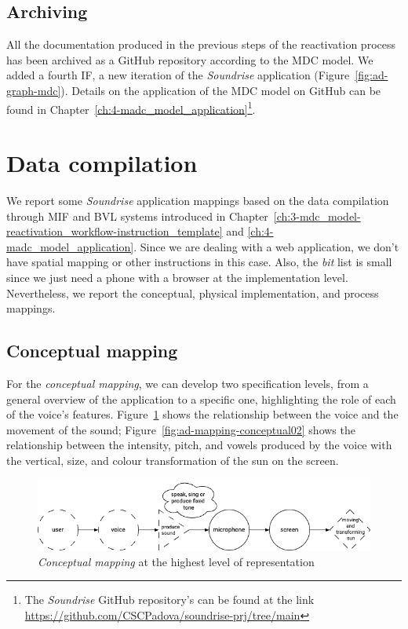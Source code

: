 \subsection*{Archiving}
All the documentation produced in the previous steps of the reactivation process has been archived as a GitHub repository according to the MDC model. We added a fourth IF, a new iteration of the \textit{Soundrise} application (Figure~\ref{fig:ad-graph-mdc}).
Details on the application of the MDC model on GitHub can be found in Chapter~\ref{ch:4-madc_model_application}\footnote{{The \textit{Soundrise} GitHub repository's can be found at the link \url{https://github.com/CSCPadova/soundrise-prj/tree/main}}}.

\section{Data compilation}
We report some \textit{Soundrise} application mappings based on the data compilation through MIF and BVL systems introduced in Chapter~\ref{ch:3-mdc_model-reactivation_workflow-instruction_template} and \ref{ch:4-madc_model_application}. Since we are dealing with a web application, we don’t have spatial mapping or other instructions in this case. Also, the \textit{bit} list is small since we just need a phone with a browser at the implementation level. Nevertheless, we report the conceptual, physical implementation, and process mappings.

\subsection*{Conceptual mapping}
For the \textit{conceptual mapping}, we can develop two specification levels, from a general overview of the application to a specific one, highlighting the role of each of the voice’s features. Figure~\ref{fig:ad-mapping-conceptual} shows the relationship between the voice and the movement of the sound; Figure~\ref{fig:ad-mapping-conceptual02} shows the relationship between the intensity, pitch, and vowels produced by the voice with the vertical, size, and colour transformation of the sun on the screen.

\begin{figure}[!h]
    \centering
    \includegraphics[width=\linewidth]{chapters/appendix/d/image/graphd-mapping-conceptual.drawio.png}
    \caption{\textit{Conceptual mapping} at the highest level of representation}
    \label{fig:ad-mapping-conceptual}
\end{figure}

